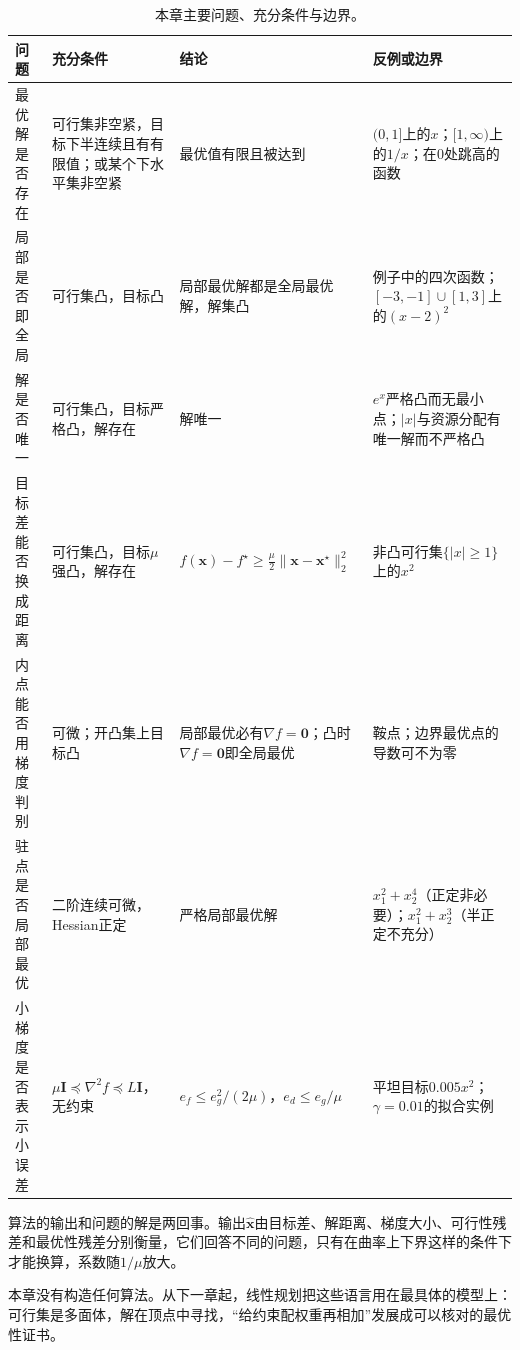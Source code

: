 \begin{table}[!htbp]
\centering
\small
\begin{tabularx}{\linewidth}{@{}>{\RaggedRight\arraybackslash}p{24mm}>{\RaggedRight\arraybackslash}X>{\RaggedRight\arraybackslash}X>{\RaggedRight\arraybackslash}X@{}}
\toprule
问题 & 充分条件 & 结论 & 反例或边界 \\
\midrule
最优解是否存在 & 可行集非空紧，目标下半连续且有有限值；或某个下水平集非空紧 & 最优值有限且被达到 & $(0,1]$上的$x$；$[1,\infty)$上的$1/x$；在$0$处跳高的函数 \\
局部是否即全局 & 可行集凸，目标凸 & 局部最优解都是全局最优解，解集凸 & 例子中的四次函数；$[-3,-1]\cup[1,3]$上的$(x-2)^2$ \\
解是否唯一 & 可行集凸，目标严格凸，解存在 & 解唯一 & $e^x$严格凸而无最小点；$\lvert x\rvert$与资源分配有唯一解而不严格凸 \\
目标差能否换成距离 & 可行集凸，目标$\mu$强凸，解存在 & $f(\bm{x})-f^\star\geq\frac{\mu}{2}\lVert\bm{x}-\bm{x}^\star\rVert_2^2$ & 非凸可行集$\{\lvert x\rvert\geq1\}$上的$x^2$ \\
内点能否用梯度判别 & 可微；开凸集上目标凸 & 局部最优必有$\nabla f=\bm{0}$；凸时$\nabla f=\bm{0}$即全局最优 & 鞍点；边界最优点的导数可不为零 \\
驻点是否局部最优 & 二阶连续可微，Hessian正定 & 严格局部最优解 & $x_1^2+x_2^4$（正定非必要）；$x_1^2+x_2^3$（半正定不充分）\\
小梯度是否表示小误差 & $\mu\bm{I}\preceq\nabla^2f\preceq L\bm{I}$，无约束 & $e_f\leq e_g^2/(2\mu)$，$e_d\leq e_g/\mu$ & 平坦目标$0.005x^2$；$\gamma=0.01$的拟合实例 \\
\bottomrule
\end{tabularx}
\caption{本章主要问题、充分条件与边界。}
\label{tab:opt-summary}
\end{table}

算法的输出和问题的解是两回事。输出$\hat{\bm{x}}$由目标差、解距离、梯度大小、可行性残差和最优性残差分别衡量，它们回答不同的问题，只有在曲率上下界这样的条件下才能换算，系数随$1/\mu$放大。

本章没有构造任何算法。从下一章起，线性规划把这些语言用在最具体的模型上：可行集是多面体，解在顶点中寻找，“给约束配权重再相加”发展成可以核对的最优性证书。
